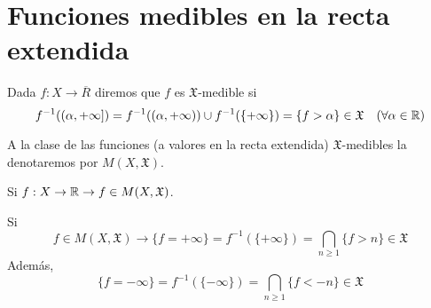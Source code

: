 \section{Funciones medibles en la recta extendida}

\begin{definition}
    Dada $f: X \to \overline{R}$ diremos que $f$ es $\mathfrak{X}$-medible si
    \begin{equation}
        f^{-1}((\alpha, +\infty]) = f^{-1}((\alpha, +\infty)) \cup f^{-1}(\{ +\infty \}) = \{ f > \alpha \} \in \mathfrak{X} \quad (\forall \alpha \in \mathbb{R})
    \end{equation}
\end{definition}

A la clase de las funciones (a valores en la recta extendida) $\mathfrak{X}$-medibles la denotaremos por $M(X, \mathfrak{X})$.

\begin{note}
    Si $f: X \to \mathbb{R} \to f \in M(X, \mathfrak{X})$.
\end{note}

\begin{note}
    Si \begin{equation}f \in M(X, \mathfrak{X}) \to \{ f = +\infty \} = f^{-1}(\{ +\infty \}) = \bigcap_{n \geq 1} \{ f > n \} \in \mathfrak{X}\end{equation}
    Además, \begin{equation}\{ f = -\infty \} = f^{-1}(\{ -\infty \}) = \bigcap_{n \geq 1} \{ f < -n \} \in \mathfrak{X}\end{equation}
\end{note}

